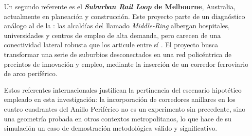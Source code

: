 Un segundo referente es el \textbf{\textit{Suburban Rail Loop} de Melbourne},
Australia, actualmente en planeación y construcción. Este proyecto parte de un
diagnóstico análogo al de la \cdmx{}: las alcaldías del llamado
\textit{Middle-Ring} albergan hospitales, universidades y centros de empleo de
alta demanda, pero carecen de una conectividad lateral robusta que los articule
entre sí \citep{suburbanrailloop2021}. El proyecto busca transformar una serie
de suburbios desconectados en una red policéntrica de precintos de innovación y
empleo, mediante la inserción de un corredor ferroviario de arco periférico.

Estos referentes internacionales justifican la pertinencia del escenario
hipotético empleado en esta investigación: la incorporación de corredores
anillares en los cuatro cuadrantes del Anillo Periférico no es un experimento
sin precedente, sino una geometría probada en otros contextos metropolitanos, lo
que hace de su simulación un caso de demostración metodológica válido y
significativo.

